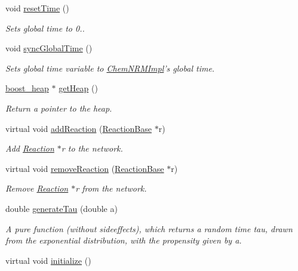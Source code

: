 \begin{DoxyCompactItemize}
void \hyperlink{classChemNRMImpl_a0f4c7dfb6010e457d2750b58ff03a623}{reset\+Time} ()
\begin{DoxyCompactList}\small\item\em Sets global time to 0.. \end{DoxyCompactList}\item 
void \hyperlink{classChemNRMImpl_aceb3f809d0ab8f23d203cbb89cae6422}{sync\+Global\+Time} ()
\begin{DoxyCompactList}\small\item\em Sets global time variable to \hyperlink{classChemNRMImpl}{Chem\+N\+R\+M\+Impl}'s global time. \end{DoxyCompactList}\item 
\hyperlink{ChemNRMImpl_8h_a57f859851909ca786c37681af9b01d45}{boost\+\_\+heap} $\ast$ \hyperlink{classChemNRMImpl_a1b20f4b9807c0b01f36f9222628c3267}{get\+Heap} ()
\begin{DoxyCompactList}\small\item\em Return a pointer to the heap. \end{DoxyCompactList}\item 
virtual void \hyperlink{classChemNRMImpl_aef0f433cc2c5c6c11b3a96801277424f}{add\+Reaction} (\hyperlink{classReactionBase}{Reaction\+Base} $\ast$r)
\begin{DoxyCompactList}\small\item\em Add \hyperlink{classReaction}{Reaction} $\ast$r to the network. \end{DoxyCompactList}\item 
virtual void \hyperlink{classChemNRMImpl_ae7c7fa1121926da886e75e2015d208db}{remove\+Reaction} (\hyperlink{classReactionBase}{Reaction\+Base} $\ast$r)
\begin{DoxyCompactList}\small\item\em Remove \hyperlink{classReaction}{Reaction} $\ast$r from the network. \end{DoxyCompactList}\item 
double \hyperlink{classChemNRMImpl_a89100a7f4c925ba44fa07e198cac0b4f}{generate\+Tau} (double a)
\begin{DoxyCompactList}\small\item\em A pure function (without sideeffects), which returns a random time tau, drawn from the exponential distribution, with the propensity given by a. \end{DoxyCompactList}\item 
virtual void \hyperlink{classChemNRMImpl_afadda6d4f7fbb164c4ea487034930f47}{initialize} ()

\end{DoxyCompactItemize}

